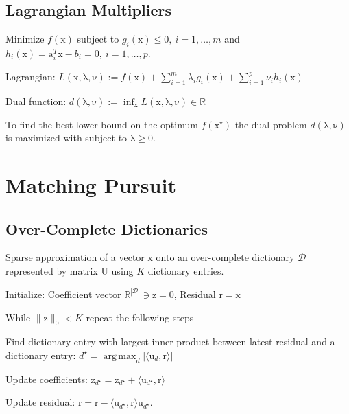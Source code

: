 \documentclass[a4paper, 11pt, landscape]{article}
\newcommand{\matr}[1]{\boldsymbol{\mathrm{#1}}}
\DeclareMathOperator*{\argmax}{arg\,max}
\begin{document}
\begin{multicols*}{3}
\subsection{Lagrangian Multipliers}
Minimize  $f(\matr{x})$ subject to $g_i(\matr{x}) \leq 0,\ i = 1, \ldots, m$ and $h_i(\matr{x}) = \matr{a}_i^T \matr{x} - b_i = 0,\ i = 1, \ldots, p$.
\begin{compactdesc}
	\item[Lagrangian:] $L(\matr{x}, \matr{\lambda}, \matr{\nu}) := f(\matr{x}) + \sum_{i=1}^m \lambda_i g_i(\matr{x}) + \sum_{i=1}^p \nu_i h_i(\matr{x})$
	\item[Dual function:] $d(\matr{\lambda}, \matr{\nu}) := \inf_{\matr{x}} L(\matr{x}, \matr{\lambda}, \matr{\nu}) \in \mathbb{R}$
\end{compactdesc}
To find the best lower bound on the optimum $f(\matr{x}^\star)$ the dual problem $d(\matr{\lambda}, \matr{\nu})$ is maximized with subject to $\matr{\lambda} \geq \matr{0}$.

\section{Matching Pursuit}
\subsection{Over-Complete Dictionaries}
Sparse approximation of a vector $\matr{x}$ onto an over-complete dictionary $\mathcal{D}$ represented by matrix $\matr{U}$ using $K$ dictionary entries.
\begin{compactenum}
	\item Initialize: Coefficient vector $\mathbb{R}^{|\mathcal{D}|} \ni \matr{z} = \matr{0}$, Residual $\matr{r} = \matr{x}$
	\item While $\|\matr{z}\|_0 < K$ repeat the following steps
	\item Find dictionary entry with largest inner product between latest residual and a dictionary entry: $d^\star = \argmax_d |\langle \matr{u}_d, \matr{r} \rangle|$
	\item Update coefficients: $\matr{z}_{d^\star} = \matr{z}_{d^\star} + \langle \matr{u}_{d^\star}, \matr{r} \rangle$
	\item Update residual: $\matr{r} = \matr{r} - \langle \matr{u}_{d^\star}, \matr{r} \rangle \matr{u}_{d^\star}$.
\end{compactenum}


\end{multicols*}
\end{document}
